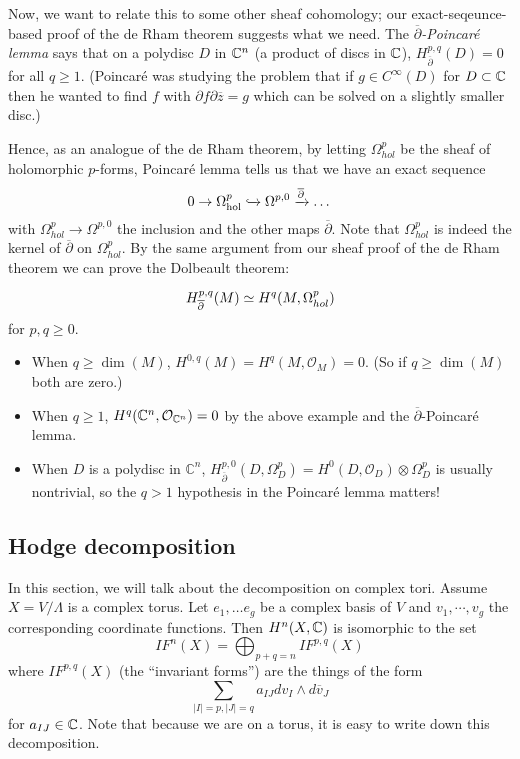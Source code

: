 Now, we want to relate this to some other sheaf cohomology; our exact-seqeunce-based proof of the de Rham theorem suggests what we need. The 
\emph{$\overline{\partial}$-Poincar\'e lemma} says that on a polydisc $D$ in ${\mathbb C}^n$ (a product of discs in ${\mathbb C}$), $H^{p,q}_{\overline{\partial}}(D)=0$ for all $q\geq 1$. (Poincar\'{e} was studying the problem that if $g\in C^\infty(D)$ for $D\subset {\mathbb C}$ then he wanted to find $f$ with $\partial f\partial \overline{z}=g$ which can be solved on a slightly smaller disc.)

Hence, as an analogue of the de Rham theorem, by letting $\Omega^p_{hol}$ be the sheaf of holomorphic $p$-forms, Poincar\'{e} lemma tells us that we have an exact sequence
$$0 \rightarrow\Omega^p_{\rm hol} \xhookrightarrow{}\Omega^{p,0} \xrightarrow{\overline{\partial}}\dots$$ 
with $\Omega^p_{hol}\to \Omega^{p,0}$ the inclusion and the other maps $\overline{\partial}$. Note that $\Omega^p_{hol}$ is indeed the kernel of $\overline{\partial}$ on $\Omega^p_{hol}$. By the same argument from our sheaf proof of the de Rham theorem we can prove the Dolbeault theorem:

\begin{theorem}
$$H^{p,q}_{\overline{\partial}}(M)\simeq H^q(M,\Omega^p_{hol})$$
for $p,q\geq 0$. 
\end{theorem}


\begin{example}
\noindent
\begin{itemize}
\item When $q\geq\dim(M)$, $H^{0,q}(M)=H^q(M,\mathcal{O}_M)=0$. (So if $q\geq \dim(M)$ both are zero.) 

\item When $q\geq 1$, $H^q(\mathbb{C}^n,\mathcal{O}_{{\mathbb C}^n})=0$ by the above example and the $\overline{\partial}$-Poincar\'{e} lemma. 
\item When $D$ is a polydisc in $\mathbb{C}^n$, $H^{p,0}_{\overline{\partial}}(D,\Omega^p_D)=H^0(D,\mathcal{O}_D)\otimes\Omega^p_D$ is usually nontrivial, so the $q>1$ hypothesis in the Poincar\'{e} lemma matters! 	
\end{itemize}
\end{example}

\subsection{Hodge decomposition}
In this section, we will talk about the decomposition on complex tori. Assume $X=V/\Lambda$ is a complex torus. Let $e_1,\dots e_g$ be a complex basis of $V$ and $v_1,\cdots, v_g$ the corresponding coordinate functions. 
Then $H^n(X,{\mathbb C})$ is isomorphic to the set 
$$IF^n(X)=\bigoplus_{p+q=n} IF^{p,q}(X)$$
where $IF^{p,q}(X)$ (the ``invariant forms'') are the things of the form 
$$\sum_{|I|=p,|J|=q} a_{IJ}dv_I\wedge d\overline{v}_J$$
for $a_{IJ}\in {\mathbb C}$. Note that because we are on a torus, it is easy to write down this decomposition.

